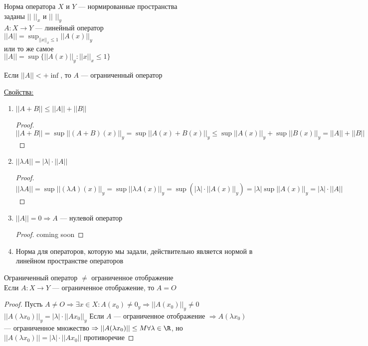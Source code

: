 \begin{Def}
\begin{Def}
Норма оператора
$X$ и $Y$ --- нормированные пространства \\
заданы $||$ $||_x$ и $||$ $||_y$ \\
$A \colon X \rightarrow Y$ --- линейный оператор \\
$||A|| = \sup_{||x||_x \le 1} ||A(x)||_y$\\
или то же самое\\
$||A|| = \sup \{||A(x)||_y \colon ||x||_x \le 1\}$
\end{Def}
\begin{Def}
Если $||A||  < +\inf$, то $A$ --- ограниченный оператор
\end{Def}
\underline{Свойства:}
\begin{enumerate}
\item $||A + B|| \le ||A|| + ||B||$
\begin{proof}
$||A + B|| = \sup ||(A + B)(x)||_y = \sup ||A(x) + B(x)||_y \le \sup ||A(x)||_y + \sup ||B(x)||_y = ||A|| + ||B||$
\end{proof}
\item $||\lambda A|| = |\lambda| \cdot ||A||$
\begin{proof}
$||\lambda A|| = \sup || (\lambda A)(x) ||_y = \sup || \lambda A(x) ||_y = \sup( |\lambda| \cdot ||A(x) ||_y) = |\lambda| \sup ||A(x)||_y = |\lambda| \cdot ||A||$
\end{proof}
\item $||A|| = 0 \Rightarrow A$ --- нулевой оператор
\begin{proof}
coming soon
\end{proof}
\item Норма для операторов, которую мы задали, действительно является нормой в линейном пространстве операторов
\end{enumerate}
\begin{Rem}
Ограниченный оператор $\neq$ ограниченное отображение\\
Если $A \colon X \rightarrow Y$ --- ограниченное отображение, то $A = O$
\end{Rem}
\begin{proof}
Пусть $A \neq O \Rightarrow \exists x \in X \colon A(x_0) \neq 0_y \Rightarrow ||A(x_0)||_y \neq 0$ \\
$||A(\lambda x_0)||_y = |\lambda| \cdot ||Ax_0||_y$
Если $A$ --- ограниченное отображение $\Rightarrow A(\lambda x_0)$ --- ограниченное множество $\Rightarrow ||A(\lambda x_0)|| \le M \forall \lambda \in \R$, но $||A(\lambda x_0)|| = |\lambda| \cdot ||Ax_0||$ противоречие

\end{proof}
\end{Def}
